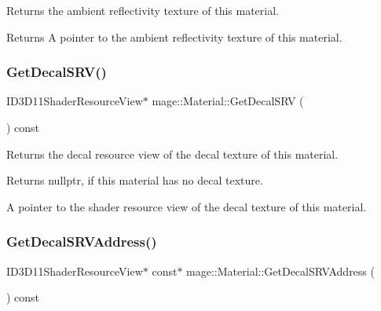 Returns the ambient reflectivity texture of this material.

\begin{DoxyReturn}{Returns}
A pointer to the ambient reflectivity texture of this material. 
\end{DoxyReturn}
\hypertarget{structmage_1_1_material_a8d189673acfe8d0c104873fe0cceb601}{}\label{structmage_1_1_material_a8d189673acfe8d0c104873fe0cceb601} 
\subsubsection{\texorpdfstring{Get\+Decal\+S\+R\+V()}{GetDecalSRV()}}
{\footnotesize\ttfamily I\+D3\+D11\+Shader\+Resource\+View$\ast$ mage\+::\+Material\+::\+Get\+Decal\+S\+RV (\begin{DoxyParamCaption}{ }\end{DoxyParamCaption}) const\hspace{0.3cm}{\ttfamily [noexcept]}}

Returns the decal resource view of the decal texture of this material.

\begin{DoxyReturn}{Returns}
{\ttfamily nullptr}, if this material has no decal texture. 

A pointer to the shader resource view of the decal texture of this material. 
\end{DoxyReturn}
\hypertarget{structmage_1_1_material_aaafa9944c4069c983ef2cff9f84e8039}{}\label{structmage_1_1_material_aaafa9944c4069c983ef2cff9f84e8039} 
\subsubsection{\texorpdfstring{Get\+Decal\+S\+R\+V\+Address()}{GetDecalSRVAddress()}}
{\footnotesize\ttfamily I\+D3\+D11\+Shader\+Resource\+View$\ast$ const$\ast$ mage\+::\+Material\+::\+Get\+Decal\+S\+R\+V\+Address (\begin{DoxyParamCaption}{ }\end{DoxyParamCaption}) const\hspace{0.3cm}{\ttfamily [noexcept]}}

